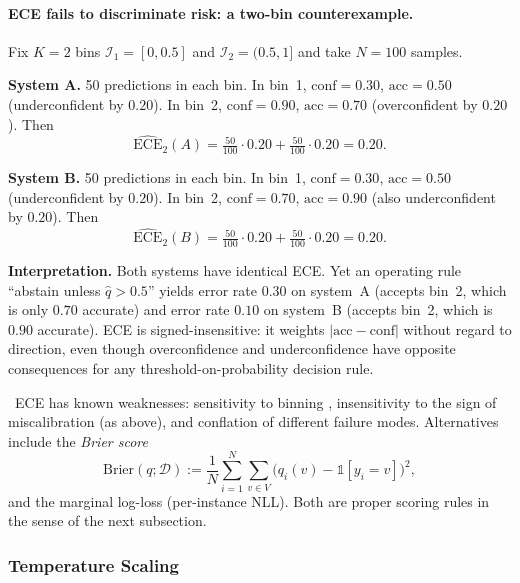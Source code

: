 \paragraph{ECE fails to discriminate risk: a two-bin counterexample.}
\begin{workedexample}
Fix $K = 2$ bins $\mathcal{I}_1 = [0, 0.5]$ and
$\mathcal{I}_2 = (0.5, 1]$ and take $N = 100$ samples.

\textbf{System A.} 50 predictions in each bin. In bin~1,
$\mathrm{conf} = 0.30$, $\mathrm{acc} = 0.50$ (underconfident by $0.20$).
In bin~2, $\mathrm{conf} = 0.90$, $\mathrm{acc} = 0.70$ (overconfident
by $0.20$). Then
\[
\widehat{\mathrm{ECE}}_2(A) = \tfrac{50}{100} \cdot 0.20 + \tfrac{50}{100} \cdot 0.20 = 0.20.
\]

\textbf{System B.} 50 predictions in each bin. In bin~1,
$\mathrm{conf} = 0.30$, $\mathrm{acc} = 0.50$ (underconfident by
$0.20$). In bin~2, $\mathrm{conf} = 0.70$, $\mathrm{acc} = 0.90$
(also underconfident by $0.20$). Then
\[
\widehat{\mathrm{ECE}}_2(B) = \tfrac{50}{100} \cdot 0.20 + \tfrac{50}{100} \cdot 0.20 = 0.20.
\]

\textbf{Interpretation.} Both systems have identical ECE. Yet an
operating rule ``abstain unless $\hat q > 0.5$'' yields error rate
$0.30$ on system~A (accepts bin~2, which is only $0.70$ accurate) and
error rate $0.10$ on system~B (accepts bin~2, which is $0.90$
accurate). ECE is signed-insensitive: it weights
$|\mathrm{acc} - \mathrm{conf}|$ without regard to direction, even
though overconfidence and underconfidence have opposite consequences
for any threshold-on-probability decision rule.
\end{workedexample}

\Cons\ ECE has known weaknesses: sensitivity to binning
\citep{kumar2019ece, nixon2019measuring}, insensitivity to the sign of
miscalibration (as above), and conflation of different failure modes.
Alternatives include the \emph{Brier score}
\begin{equation}
\mathrm{Brier}(q; \mathcal{D})
  := \frac{1}{N} \sum_{i=1}^{N} \sum_{v \in V}
       \big( q_i(v) - \mathbb{1}[y_i = v] \big)^2,
\label{eq:brier}
\end{equation}
and the marginal log-loss (per-instance NLL). Both are proper scoring
rules in the sense of the next subsection.

\subsubsection{Temperature Scaling}

